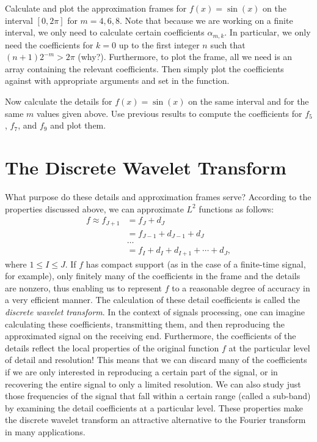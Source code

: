 \begin{problem}
Calculate and plot the approximation frames for $f(x) = \sin(x)$ on the interval $[0,2\pi]$
for $m = 4, 6, 8$. Note that because we are working on a finite interval,
we only need to calculate certain coefficients $\alpha_{m,k}$. In
particular, we only need the coefficients for $k = 0$ up to the first integer
$n$ such that $(n+1)2^{-m} > 2 \pi$ (why?). Furthermore, to plot the frame,
all we need is an array containing the relevant coefficients. Then simply plot
the coefficients against  with appropriate arguments
and set  in the  function.
\end{problem}

\begin{problem}
Now calculate the details for $f(x) = \sin(x)$ on the same interval and for the
same $m$ values given above. Use previous results to compute the coefficients
for $f_5$, $f_7$, and $f_9$ and plot them.
\end{problem}

\section*{The Discrete Wavelet Transform}

What purpose do these details and approximation frames serve? According to the
properties discussed above, we can approximate $L^2$ functions as follows:
\begin{align*}
f \approx f_{J+1} &= f_J + d_J \\
&= f_{J-1} + d_{J-1} + d_J \\
& \ldots\\
&= f_{I} + d_{I} + d_{I+1} + \cdots + d_J,
\end{align*}
where $1 \leq I \leq J$. If $f$ has compact support (as in the case of a finite-time signal,
for example), only finitely many of the coefficients in the frame and the details are
nonzero, thus enabling us to represent $f$ to a reasonable degree of accuracy in a very
efficient manner. The calculation of these detail coefficients is called the \emph{discrete
wavelet transform}. In the context of signals processing, one can imagine calculating these
coefficients, transmitting them, and then reproducing the approximated signal on the
receiving end. Furthermore, the coefficients of the details reflect the local properties
of the original function $f$ at the particular level of detail and resolution! This means
that we can discard many of the coefficients if we are only interested in reproducing a certain
part of the signal, or in recovering the entire signal to only a limited resolution. We can
also study just those frequencies of the signal that fall within a certain range (called a
sub-band) by examining the detail coefficients at a particular level. These
properties make the discrete wavelet transform an attractive alternative to the Fourier
transform in many applications.

